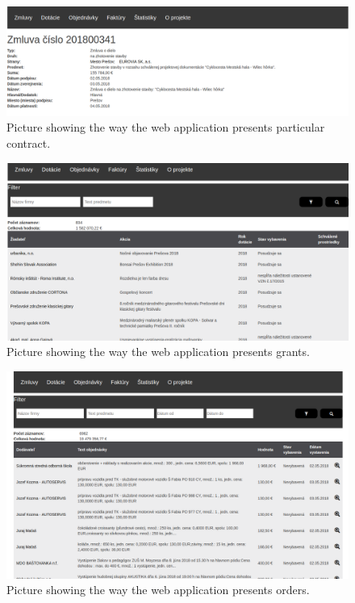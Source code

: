 \documentclass[thesis=B,english]{FITthesis}[2012/06/26]
\begin{document}
{\begin{figure}[H]
  \begin{center}
  \includegraphics[scale=0.30]{pictures/contractDetail.png}
  \caption{Picture showing the way the web application presents particular contract.}
    \label{fig:webapp-contract-detail}
  \end{center}
\end{figure}

\begin{figure}[H]
  \begin{center}
  \includegraphics[scale=0.30]{pictures/grants.png}
  \caption{Picture showing the way the web application presents grants.}
    \label{fig:webapp-grants}
  \end{center}
\end{figure}

\begin{figure}[H]
  \begin{center}
  \includegraphics[scale=0.30]{pictures/orders.png}
  \caption{Picture showing the way the web application presents orders.}
    \label{fig:webapp-orders}
  \end{center}
\end{figure}

}
\end{document}
